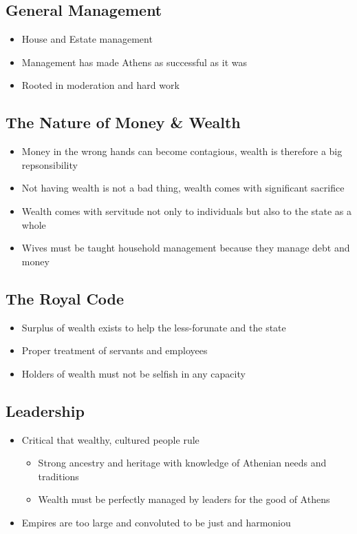 \documentclass[11pt]{article}
\begin{document}
\subsection{General Management}
\label{sec:orgb080aea}
\begin{itemize}
\item House and Estate management
\item Management has made Athens as successful as it was
\item Rooted in moderation and hard work
\end{itemize}
\subsection{The Nature of Money \& Wealth}
\label{sec:org326b565}
\begin{itemize}
\item Money in the wrong hands can become contagious, wealth is therefore a big repsonsibility
\item Not having wealth is not a bad thing, wealth comes with significant sacrifice
\item Wealth comes with servitude not only to individuals but also to the state as a whole
\item Wives must be taught household management because they manage debt and money
\end{itemize}
\subsection{The Royal Code}
\label{sec:org76a3bd4}
\begin{itemize}
\item Surplus of wealth exists to help the less-forunate and the state
\item Proper treatment of servants and employees
\item Holders of wealth must not be selfish in any capacity
\end{itemize}
\subsection{Leadership}
\label{sec:orgbdf413b}
\begin{itemize}
\item Critical that wealthy, cultured people rule
\begin{itemize}
\item Strong ancestry and heritage with knowledge of Athenian needs and traditions
\item Wealth must be perfectly managed by leaders for the good of Athens
\end{itemize}
\item Empires are too large and convoluted to be just and harmoniou
\end{itemize}
\end{document}
